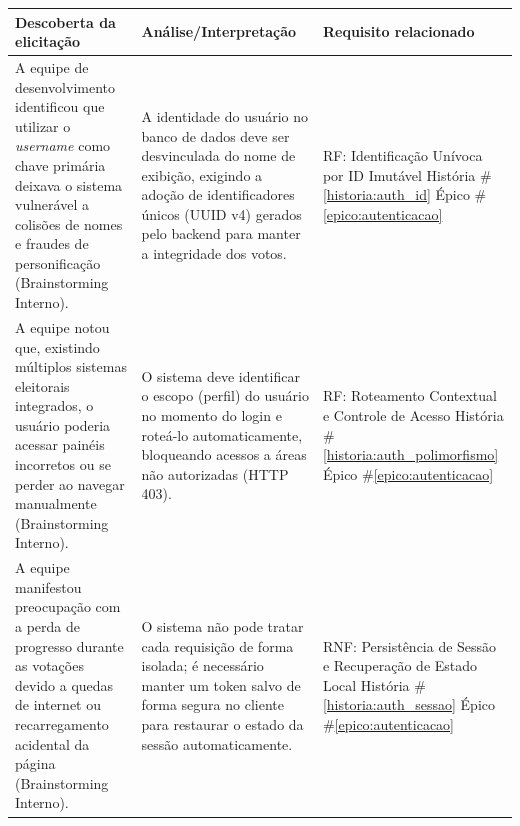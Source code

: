 \documentclass[12pt,a4paper]{article}
\newcounter{epico}
\newcounter{historia}
\begin{document}
\begin{longtable}{|p{7cm}|p{4.5cm}|p{4.5cm}|}
    \hline
    \rowcolor[gray]{0.9}
    \textbf{Descoberta da elicitação} & \textbf{Análise/Interpretação} & \textbf{Requisito relacionado} \\
    \hline
    
    A equipe de desenvolvimento identificou que utilizar o \textit{username} como chave primária deixava o sistema vulnerável a colisões de nomes e fraudes de personificação (Brainstorming Interno). 
    & A identidade do usuário no banco de dados deve ser desvinculada do nome de exibição, exigindo a adoção de identificadores únicos (UUID v4) gerados pelo backend para manter a integridade dos votos.
    & RF: Identificação Unívoca por ID Imutável
    \newline \newline História \#\ref{historia:auth_id}
    \newline \newline Épico \#\ref{epico:autenticacao} \\
    
    \hline
    
    A equipe notou que, existindo múltiplos sistemas eleitorais integrados, o usuário poderia acessar painéis incorretos ou se perder ao navegar manualmente (Brainstorming Interno).
    & O sistema deve identificar o escopo (perfil) do usuário no momento do login e roteá-lo automaticamente, bloqueando acessos a áreas não autorizadas (HTTP 403).
    & RF: Roteamento Contextual e Controle de Acesso
    \newline \newline História \#\ref{historia:auth_polimorfismo} 
    \newline \newline Épico \#\ref{epico:autenticacao} \\

    \hline
    
    A equipe manifestou preocupação com a perda de progresso durante as votações devido a quedas de internet ou recarregamento acidental da página (Brainstorming Interno).
    & O sistema não pode tratar cada requisição de forma isolada; é necessário manter um token salvo de forma segura no cliente para restaurar o estado da sessão automaticamente.
    & RNF: Persistência de Sessão e Recuperação de Estado Local
    \newline \newline História \#\ref{historia:auth_sessao} 
    \newline \newline Épico \#\ref{epico:autenticacao} \\
    

\end{longtable}
\end{document}
